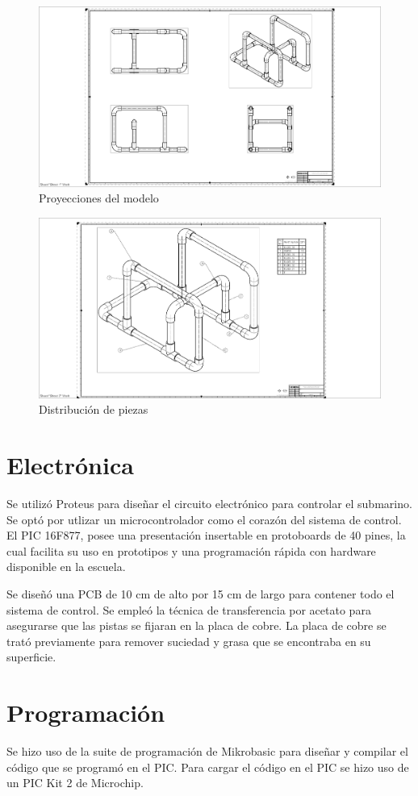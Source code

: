   \begin{figure}[!htbp]
 \centering
 \includegraphics [scale=0.25]
  {./img/seaperch_vistas.png}
  \caption{Proyecciones del modelo}
 \end{figure}

  \begin{figure}[!htbp]
 \centering
 \includegraphics [scale=0.25]
  {./img/seaperch_piezas.png}
  \caption{Distribuci\'on de piezas}
 \end{figure}

 \pagebreak

\section{Electr\'onica}
Se utiliz\'o Proteus para dise\~nar el circuito electr\'onico para controlar el submarino. Se opt\'o por utlizar
un microcontrolador como el coraz\'on del sistema de control. El PIC 16F877, posee una presentaci\'on insertable
en protoboards de 40 pines, la cual facilita su uso en prototipos y una programaci\'on r\'apida con hardware disponible
en la escuela.

Se dise\~n\'o una PCB de 10 cm de alto por 15 cm de largo para contener todo el sistema de control. Se emple\'o la
t\'ecnica de transferencia por acetato para asegurarse que las pistas se fijaran en la placa de cobre. La placa de cobre se
trat\'o previamente para remover suciedad y grasa que se encontraba en su superficie.


\section{Programaci\'on}
Se hizo uso de la suite de programaci\'on de Mikrobasic para dise\~nar y compilar el c\'odigo que se program\'o en el PIC.
Para cargar el c\'odigo en el PIC se hizo uso de un PIC Kit 2 de Microchip.
